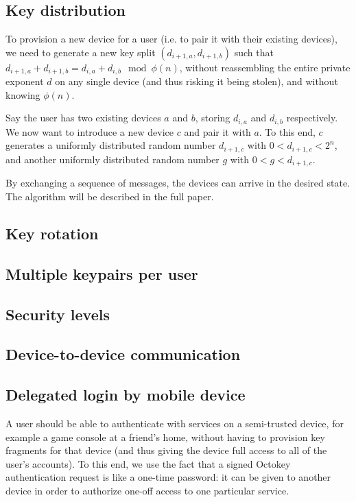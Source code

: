 \subsection{Key distribution}

To provision a new device for a user (i.e. to pair it with their existing devices), we need to
generate a new key split $(d_{i+1,a}, d_{i+1,b})$ such that
$d_{i+1,a} + d_{i+1,b} = d_{i,a} + d_{i,b} \mod \phi(n)$, without reassembling the entire private
exponent $d$ on any single device (and thus risking it being stolen), and without knowing $\phi(n)$.

Say the user has two existing devices $a$ and $b$, storing $d_{i,a}$ and $d_{i,b}$ respectively. We
now want to introduce a new device $c$ and pair it with $a$. To this end, $c$ generates a uniformly
distributed random number $d_{i+1,c}$ with $0 < d_{i+1,c} < 2^n$, and another uniformly distributed
random number $g$ with $0 < g < d_{i+1,c}$.

By exchanging a sequence of messages, the devices can arrive in the desired state. The algorithm
will be described in the full paper.

\subsection{Key rotation}
\subsection{Multiple keypairs per user}
\subsection{Security levels}
\subsection{Device-to-device communication}


\subsection{Delegated login by mobile device}\label{sec:delegation}

A user should be able to authenticate with services on a semi-trusted device, for example a game
console at a friend's home, without having to provision key fragments for that device (and thus
giving the device full access to all of the user's accounts). To this end, we use the fact that a
signed Octokey authentication request is like a one-time password: it can be given to another device
in order to authorize one-off access to one particular service.


